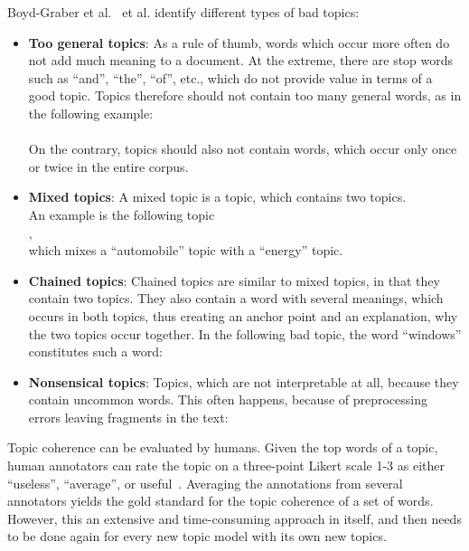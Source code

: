 \documentclass[
        a4paper,
        titlepage,
        twoside,
        parskip
        ]{scrbook}
\theoremstyle{break}
\begin{document}
Boyd-Graber et al.~\cite{Boyd-graber2014} et al. identify different types of bad topics:
\begin{itemize}
  \item
    \textbf{Too general topics}: As a rule of thumb, words which occur more often do not add much meaning to a document.
    At the extreme, there are stop words such as ``and'', ``the'', ``of'', etc., which do not provide value in terms of a good topic.
    Topics therefore should not contain too many general words, as in the following example: \\
    \hspace*{0cm}  \\
    On the contrary, topics should also not contain words, which occur only once or twice in the entire corpus.
  \item
    \textbf{Mixed topics}: A mixed topic is a topic, which contains two topics. \\
    An example is the following topic \\
    \hspace*{0cm} , \\
    which mixes a ``automobile'' topic with a ``energy'' topic.
  \item
    \textbf{Chained topics}: Chained topics are similar to mixed topics, in that they contain two topics.
    They also contain a word with several meanings, which occurs in both topics, thus creating an anchor point and an explanation, why the two topics occur together.
    In the following bad topic, the word ``windows'' constitutes such a word: \\
    \hspace*{0cm} 
  \item
    \textbf{Nonsensical topics}:
    Topics, which are not interpretable at all, because they contain uncommon words.
    This often happens, because of preprocessing errors leaving fragments in the text: \\
    \hspace*{0cm} 
\end{itemize}

Topic coherence can be evaluated by humans.
Given the top words of a topic, human annotators can rate the topic on a three-point Likert scale 1-3 as either ``useless'', ``average'', or useful~\cite{Aletras2013}.
Averaging the annotations from several annotators yields the gold standard for the topic coherence of a set of words.
However, this an extensive and time-consuming approach in itself, and then needs to be done again for every new topic model with its own new topics.
\end{document}

